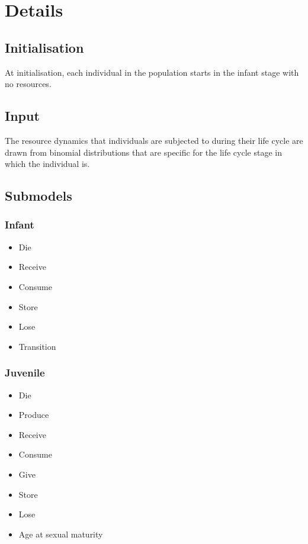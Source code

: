 \documentclass{article}
\begin{document}
\section{Details}

\subsection{Initialisation}

At initialisation, each individual in the population starts in the infant stage with no resources. 

\subsection{Input}

The resource dynamics that individuals are subjected to during their life cycle are drawn from binomial distributions that are specific for the life cycle stage in which the individual is.

\subsection{Submodels}

\subsubsection{Infant}

\begin{itemize}
    \item Die
    \item Receive
    \item Consume
    \item Store
    \item Lose
    \item Transition
\end{itemize}

\subsubsection{Juvenile}

\begin{itemize}
    \item Die
    \item Produce
    \item Receive
    \item Consume
    \item Give
    \item Store
    \item Lose
    \item Age at sexual maturity
\end{itemize}
\end{document}
